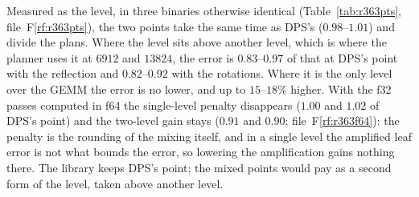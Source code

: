 \documentclass[11pt]{article}
\newcommand{\rf}[1]{F\ref{rf:#1}}
\begin{document}
Measured as the level, in three binaries otherwise identical
(Table~\ref{tab:r363pts}, file~\rf{r363pts}), the two points take the same
time as DPS's ($0.98$--$1.01$) and divide the plans.  Where the level sits
above another level, which is where the planner uses it at $6912$ and
$13824$, the error is $0.83$--$0.97$ of that at DPS's point with the
reflection and $0.82$--$0.92$ with the rotations.  Where it is the only level
over the GEMM the error is no lower, and up to $15$--$18\%$ higher.  With
the f32 passes computed in f64 the single-level penalty disappears ($1.00$
and $1.02$ of DPS's point) and the two-level gain stays ($0.91$ and $0.90$;
file~\rf{r363f64}): the penalty is the rounding of the mixing itself, and in
a single level the amplified leaf error is not what bounds the error, so
lowering the amplification gains nothing there.  The library keeps DPS's
point; the mixed points would pay as a second form of the level, taken above
another level.
\end{document}
